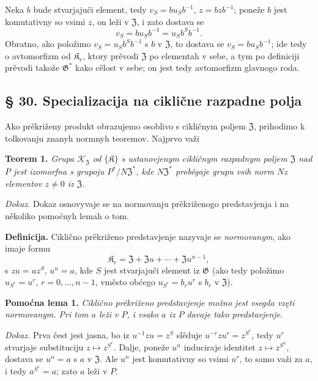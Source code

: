 \documentclass[11pt]{article}
\begin{document}
Neka \(b\) bude stvarjajuči element, tedy \(v_S=bu_Sb^{-1}\), \(z=bzb^{-1}\); poneže \(b\) jest komutativny so vsimi \(z\), on leži v \(\mathfrak Z\), i zato dostava se
\[
v_S=bu_Sb^{-1}=u_Sb^Sb^{-1}.
\]
Obratno, ako položimo \(v_S=u_Sb^Sb^{-1}\) s \(b\) v \(\mathfrak Z\), to dostava se \(v_S=bu_Sb^{-1}\); ide tedy o avtomorfizm od \(\mathfrak K_r\), ktory prěvodi \(\mathfrak Z\) po elementah v sebe, a tym po definiciji prěvodi takože \(\mathfrak G^*\) kako cělost v sebe; on jest tedy avtomorfizm glavnogo roda.

\subsection*{§ 30. Specializacija na ciklične razpadne polja}\label{spezialisierung-auf-zyklische-zerfaellungskoerper}

Ako prěkriženy produkt obrazujemo osoblivo s cikličnym poljem \(\mathfrak Z\), prihodimo k tolkovanju znanyh normnyh teoremov. Najprvo važi

\noindent\textbf{Teorem 1.} \emph{Grupa \(\mathscr K_{\mathfrak Z}\) od \(\{\mathfrak K\}\) s ustanovjenym cikličnym razpadnym poljem \(\mathfrak Z\) nad \(P\) jest izomorfna s grupoju \(P^*/N\mathfrak Z^*\), kde \(N\mathfrak Z^*\) proběgaje grupu vsih norm \(Nz\) elementov \(z\neq0\) iz \(\mathfrak Z\).}

\noindent\emph{Dokaz.} Dokaz osnovyvaje se na normovanju prěkriženogo predstavjenja i na několiko pomoćnyh lemah o tom.

\noindent\textbf{Definicija.} Ciklično prěkriženo predstavjenje nazyvaje se \emph{normovanym}, ako imaje formu
\[
\mathfrak K_r=\mathfrak Z+\mathfrak Zu+\cdots+\mathfrak Zu^{n-1},
\]
s \(zu=uz^S\), \(u^n=a\), kde \(S\) jest stvarjajuči element iz \(\mathfrak G\) (ako tedy položimo \(u_{S^r}=u^r\), \(r=0,\ldots,n-1\), vměsto obćego \(u_{S^r}=b_ru^r\) s \(b_r\) v \(\mathfrak Z\)).

\noindent\textbf{Pomoćna lema 1.} \emph{Ciklično prěkriženo predstavjenje možno jest vsegda vzęti normovanym. Pri tom \(a\) leži v \(P\), i vsako \(a\) iz \(P\) davaje tako predstavjenje.}

\noindent\emph{Dokaz.} Prva čest jest jasna, bo iz \(u^{-1}zu=z^S\) slěduje \(u^{-r}zu^r=z^{S^r}\), tedy \(u^r\) stvarjaje substituciju \(z\mapsto z^{S^r}\). Dalje, poneže \(u^n\) induciraje identitet \(z\mapsto z^{S^n}\), dostava se \(u^n=a\) s \(a\) v \(\mathfrak Z\). Ale \(u^n\) jest komutativny so vsimi \(u^r\), to samo važi za \(a\), i tedy \(a^{S^r}=a\); zato \(a\) leži v \(P\).
\end{document}
